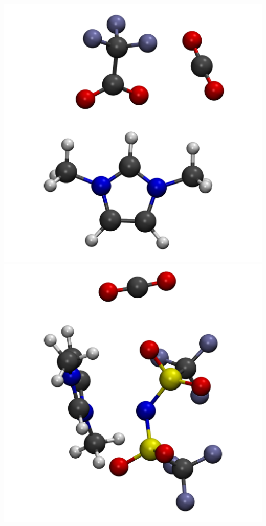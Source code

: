 \documentclass{beamer}
\begin{document}
\begin{frame}
  \includegraphics[scale=0.07]{./figures/cluster_TFA.png}
  \includegraphics[scale=0.08]{./figures/cluster_Tf2N.png}

\end{frame}
\end{document}

